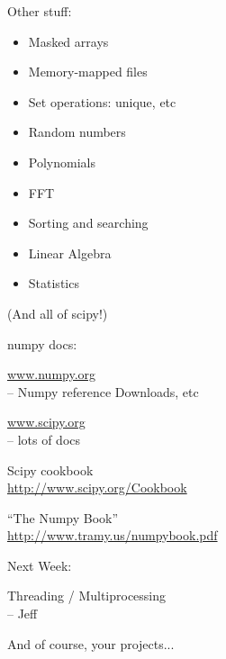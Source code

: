 \documentclass{beamer}
\begin{document}
\begin{frame}[fragile]{Other stuff:}

\begin{itemize}
  \item Masked arrays
  \item Memory-mapped files
  \item Set operations: unique, etc
  \item Random numbers
  \item Polynomials
  \item FFT
  \item Sorting and searching
  \item Linear Algebra
  \item Statistics
\end{itemize}

{\large (And all of scipy!)}

\end{frame} 

\begin{frame}[fragile]{numpy docs:}

\url{www.numpy.org}\\
   -- Numpy reference Downloads, etc

\vfill
\url{www.scipy.org}\\
   -- lots of docs

\vfill
{\large Scipy cookbook}\\
\url{http://www.scipy.org/Cookbook}

\vfill
{\large ``The Numpy Book''}\\
\url{http://www.tramy.us/numpybook.pdf}


\end{frame} 





\begin{frame}[fragile]{Next Week:}

\vfill
{\LARGE Threading / Multiprocessing}\\[0.2in]
{\Large  \hspace{0.5in} -- Jeff}


\vfill
{\Large And of course, your projects...}

\vfill

\end{frame}
\end{document}
